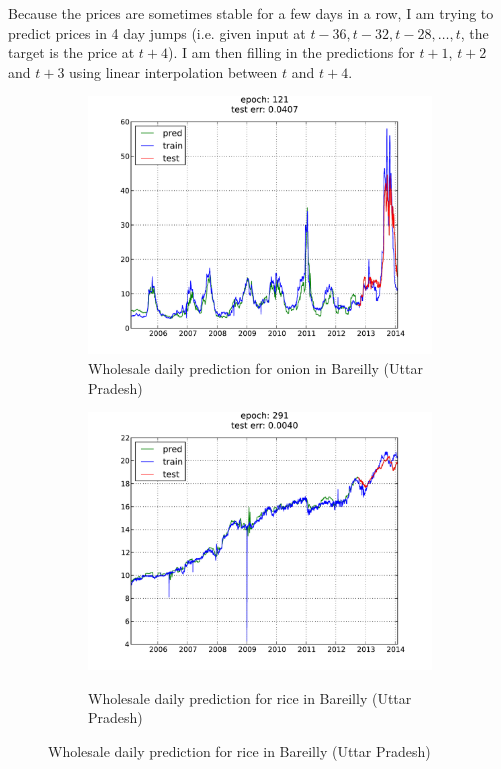 Because the prices are sometimes stable for a few days in a row, I am trying to
predict prices in 4 day jumps (i.e. given input at $t-36, t-32, t-28, \dots,
t$, the target is the price at $t+4$). I am then filling in the predictions for
$t+1$, $t+2$ and $t+3$ using linear interpolation between $t$ and $t+4$.

\begin{figure}[H]
        \begin{subfigure}[b]{.45\linewidth}
        \centering
        \includegraphics[width=\textwidth]{img/ffnn/3.pdf}
        \caption{Wholesale daily prediction for onion in Bareilly (Uttar Pradesh)}
        \label{subfig:ffnn_pred_3}
        \end{subfigure}
        \quad
        \begin{subfigure}[b]{.45\linewidth}
        \centering
        \includegraphics[width=\textwidth]{img/ffnn/4.pdf}
        \label{subfig:ffnn_pred_4}
        \caption{Wholesale daily prediction for rice in Bareilly (Uttar Pradesh)}
        \end{subfigure}
\end{figure}

